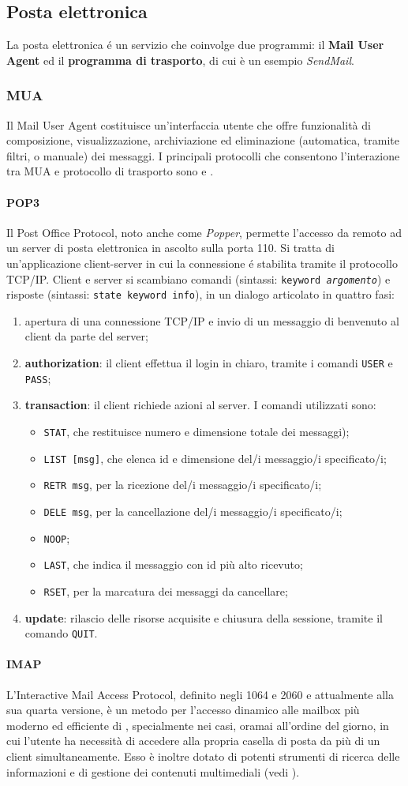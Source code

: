 \documentclass[a4paper,11pt]{article}
\def\code#1{\texttt{#1}}
\def\sub#1{\subsection{#1}\label{#1}}
\def\subsub#1{\subsubsection{#1}\label{#1}}
\def\para#1{\paragraph{#1}\label{#1}}
\def\vedi#1{\nameref{#1}}
\begin{document}
 \sub {Posta elettronica}
La posta elettronica \'e un servizio che coinvolge due programmi: il \textbf{Mail User Agent} ed il \textbf{programma di trasporto}, di cui è un esempio \textit{SendMail}. 
\subsub{MUA} Il Mail User Agent costituisce un'interfaccia utente che offre funzionalità di composizione, visualizzazione, archiviazione ed eliminazione (automatica, tramite filtri, o manuale) dei messaggi.
I principali protocolli che consentono l'interazione tra MUA e protocollo di trasporto sono \vedi{POP3} e \vedi{IMAP}. 
\para{POP3}
Il Post Office Protocol, noto anche come \textit{Popper}, permette l'accesso da remoto ad un server di posta elettronica in ascolto sulla porta 110.
Si tratta di un'applicazione client-server in cui la connessione \'e stabilita tramite il protocollo TCP/IP. Client e server si scambiano comandi (sintassi: \code{keyword \textit{argomento}}) e risposte (sintassi: \code{state keyword info}), in un dialogo articolato in quattro fasi:
\begin{enumerate}
\item apertura di una connessione TCP/IP e invio di un messaggio di benvenuto al client da parte del server;
\item \textbf{authorization}: il client effettua il login in chiaro, tramite i comandi \code{USER} e \code{PASS};
\item \textbf{transaction}: il client richiede azioni al server. I comandi utilizzati sono:
\begin{itemize}
\item \code{STAT}, che restituisce numero e dimensione totale dei messaggi);
\item \code{LIST [msg]}, che elenca id e dimensione del/i messaggio/i specificato/i;
\item \code{RETR msg}, per la ricezione del/i messaggio/i specificato/i;
\item \code{DELE msg}, per la cancellazione del/i messaggio/i specificato/i;
\item \code{NOOP};
\item \code{LAST}, che indica il messaggio con id più alto ricevuto;
\item \code{RSET}, per la marcatura dei messaggi da cancellare;
\end{itemize}
\item \textbf{update}: rilascio delle risorse acquisite e chiusura della sessione, tramite il comando \code{QUIT}.
\end{enumerate}
\para{IMAP}
L'Interactive Mail Access Protocol, definito negli \vedi{RFC} 1064 e 2060 e attualmente alla sua quarta versione, è un metodo per l'accesso dinamico alle mailbox più moderno ed efficiente di \vedi{POP3}, specialmente nei casi, oramai all'ordine del giorno, in cui l'utente ha necessità di accedere alla propria casella di posta da più di un client simultaneamente. Esso è inoltre dotato di potenti strumenti di ricerca delle informazioni e di gestione dei contenuti multimediali (vedi \vedi{MIME}). 
\end{document}
